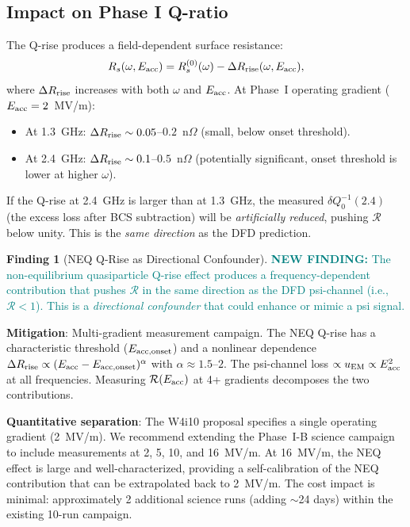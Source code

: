 \documentclass[11pt]{article}
\newcommand{\newfinding}[1]{\textcolor{teal}{\textbf{NEW FINDING:} #1}}
\theoremstyle{definition}
\newtheorem{finding}[theorem]{Finding}
\theoremstyle{remark}
\begin{document}
\subsection{Impact on Phase I Q-ratio}

The Q-rise produces a field-dependent surface resistance:
\begin{equation}
R_s(\omega, E_{\rm acc}) = R_s^{(0)}(\omega) -
\Delta R_{\rm rise}(\omega, E_{\rm acc}),
\end{equation}
where $\Delta R_{\rm rise}$ increases with both $\omega$ and $E_{\rm acc}$.
At Phase~I operating gradient ($E_{\rm acc} = 2$~MV/m):

\begin{itemize}[nosep]
\item At 1.3~GHz: $\Delta R_{\rm rise} \sim 0.05$--$0.2$~n$\Omega$
  (small, below onset threshold).
\item At 2.4~GHz: $\Delta R_{\rm rise} \sim 0.1$--$0.5$~n$\Omega$
  (potentially significant, onset threshold is lower at higher $\omega$).
\end{itemize}

If the Q-rise at 2.4~GHz is larger than at 1.3~GHz, the measured
$\delta Q_0^{-1}(2.4)$ (the excess loss after BCS subtraction) will
be \emph{artificially reduced}, pushing $\mathcal{R}$ below unity.
This is the \emph{same direction} as the DFD prediction.

\begin{finding}[NEQ Q-Rise as Directional Confounder]
\label{find:neq}
\newfinding{The non-equilibrium quasiparticle Q-rise effect produces a
frequency-dependent contribution that pushes $\mathcal{R}$ in the
same direction as the DFD psi-channel (i.e., $\mathcal{R} < 1$).
This is a \emph{directional confounder} that could enhance or mimic
a psi signal.}

\textbf{Mitigation}: Multi-gradient measurement campaign. The NEQ
Q-rise has a characteristic threshold ($E_{\rm acc,onset}$) and a
nonlinear dependence $\Delta R_{\rm rise} \propto (E_{\rm acc} -
E_{\rm acc,onset})^\alpha$ with $\alpha \approx 1.5$--$2$.
The psi-channel loss $\propto u_{\rm EM} \propto E_{\rm acc}^2$
at all frequencies. Measuring $\mathcal{R}(E_{\rm acc})$ at
4+ gradients decomposes the two contributions.

\textbf{Quantitative separation}: The W4i10 proposal specifies a
single operating gradient (2~MV/m). We recommend extending the
Phase~I-B science campaign to include measurements at 2, 5, 10,
and 16~MV/m. At 16~MV/m, the NEQ effect is large and well-characterized,
providing a self-calibration of the NEQ contribution that can be
extrapolated back to 2~MV/m. The cost impact is minimal:
approximately 2 additional science runs (adding $\sim$24 days)
within the existing 10-run campaign.
\end{finding}
\end{document}
